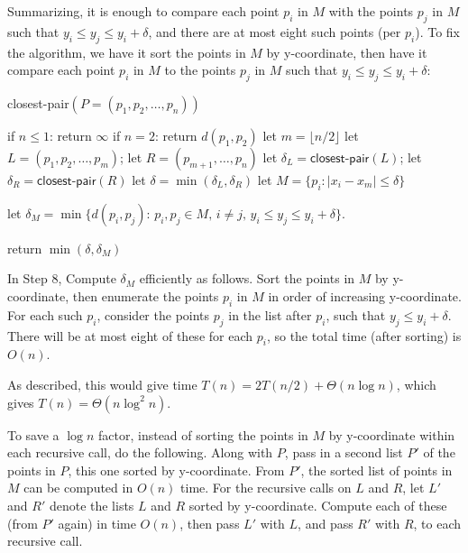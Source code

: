 Summarizing, it is enough to compare each point $p_i$ in $M$
with the points $p_j$ in $M$ such that $y_i \le y_j \le y_i + \delta$,
and there are at most eight such points (per $p_i$).
To fix the algorithm,
we have it sort the points in $M$ by y-coordinate,
then have it compare each point $p_i$ in $M$
to the points $p_j$ in $M$ such that $y_i \le y_j \le y_i + \delta$:

\begin{myframed}
\begin{steps}
  \item[] {\sf closest-pair}$(P=(p_1, p_2, \ldots, p_n))$

    \step if $n \le 1$: return $\infty$
    \step if $n = 2$: return $d(p_1, p_2)$
    \step let $m=\lfloor n/2\rfloor$
    \step let $L=(p_1, p_2, \ldots, p_m)$;
    let $R=(p_{m+1}, \ldots, p_n)$
    \step let $\delta_L = \textsf{closest-pair}(L)$; let $\delta_R = \textsf{closest-pair}(R)$
    \step let $\delta = \min(\delta_L, \delta_R)$
    \step let $M=\{p_i : |x_i - x_m| \le \delta\}$

    \step let $\delta_M =\min\{ d(p_i, p_j) :\, p_i, p_j\in M, \, i\ne j, \, y_i \le y_j \le y_i + \delta\}$.

    \step return $\min(\delta, \delta_M)$
  \end{steps}
\end{myframed}

In Step 8, Compute $\delta_M$ efficiently as follows.
Sort the points in $M$ by y-coordinate,
then enumerate the points $p_i$ in $M$
in order of increasing y-coordinate.
For each such $p_i$,
consider the points $p_j$ in the list after $p_i$,
such that $y_j \le y_i + \delta$.
There will be at most eight of these for each $p_i$,
so the total time (after sorting) is $O(n)$.

As described, this would give time $T(n) = 2T(n/2) + \Theta(n\log n)$,
which gives $T(n) = \Theta(n\log^2 n)$.

To save a $\log n$ factor,
instead of sorting the points in $M$ by y-coordinate
within each recursive call, do the following.
Along with $P$, pass in a second list $P'$ of the points in $P$,
this one sorted by y-coordinate.
From $P'$, the sorted list of points in $M$ can be computed in $O(n)$ time.
For the recursive calls on $L$ and $R$,
let $L'$ and $R'$ denote the lists $L$ and $R$ sorted by y-coordinate.
Compute each of these (from $P'$ again) in time $O(n)$,
then pass $L'$ with $L$, and pass $R'$ with $R$,
to each recursive call.

